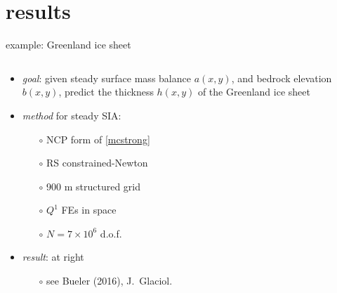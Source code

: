\documentclass[xcolor={dvipsnames}]{beamer}
\begin{document}
\section{results}

\begin{frame}{example: Greenland ice sheet}

\begin{columns}
\begin{column}{0.6\textwidth}
\begin{itemize}
\item \emph{goal}: given steady surface mass balance $a(x,y)$, and bedrock elevation $b(x,y)$, predict the thickness $h(x,y)$ of the Greenland ice sheet

\medskip
\item \emph{method} for steady SIA:
  \begin{itemize}
  \item[$\circ$] NCP form of \eqref{mcstrong}
  \item[$\circ$] RS constrained-Newton
  \item[$\circ$] 900 m structured grid
  \item[$\circ$] $Q^1$ FEs in space
  \item[$\circ$] $N=7\times 10^6$ d.o.f.
  \end{itemize}

\medskip
\item \emph{result}: at right
  \begin{itemize}
  \item[$\circ$] see Bueler (2016), J.~Glaciol.
  \end{itemize}
\end{itemize}
\end{column}
\begin{column}{0.4\textwidth}
\vspace{-5mm}


\end{column}
\end{columns}
\end{frame}
\end{document}
